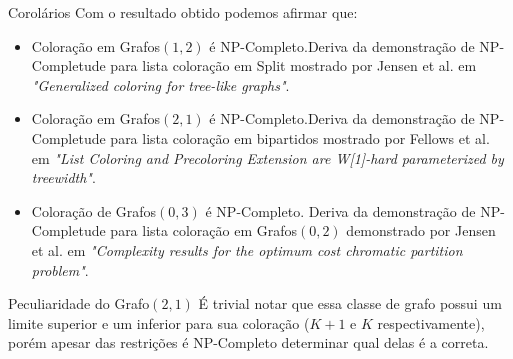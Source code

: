 \documentclass[9pt, compress]{beamer}
\begin{document}
    \begin{frame}{Corolários}
      Com o resultado obtido podemos afirmar que:
      \begin{itemize}
        \item Coloração em Grafos$(1,2)$ é NP-Completo.\newline Deriva da demonstração de NP-Completude para lista coloração em Split mostrado por Jensen et al. em \textit{"Generalized coloring for tree-like graphs"}.
        \item Coloração em Grafos$(2,1)$ é NP-Completo.\newline Deriva da demonstração de NP-Completude para lista coloração em bipartidos mostrado por Fellows et al. em \textit{"List Coloring and Precoloring Extension are W[1]-hard parameterized by treewidth"}.
        \item Coloração de Grafos$(0,3)$ é NP-Completo.
        \newline Deriva da demonstração de NP-Completude para lista coloração em Grafos$(0,2)$ demonstrado por Jensen et al. em \textit{"Complexity results for the optimum cost chromatic partition problem"}.
      \end{itemize}
    \end{frame}
    \begin{frame}{ Peculiaridade do Grafo$(2,1)$ }
      É trivial notar que essa classe de grafo possui um limite superior e um inferior para sua coloração ($K+1$ e $K$ respectivamente), porém apesar das restrições é NP-Completo determinar qual delas é a correta.
    \end{frame}
\end{document}

